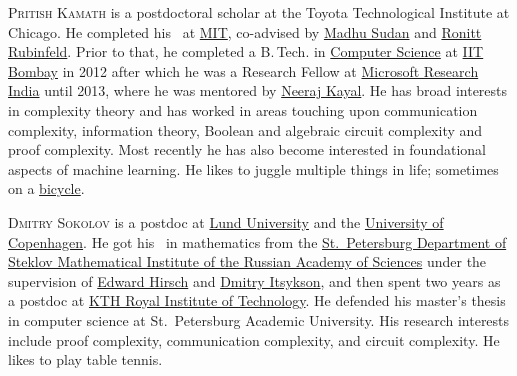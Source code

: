 \documentclass{toc}
\begin{document}
\begin{tocaboutauthors}
\begin{tocabout}[kamath]
 \textsc{Pritish Kamath} is a postdoctoral scholar at the Toyota Technological Institute at Chicago. He completed his \phd\ at \href{www.mit.edu}{MIT}, co-advised by
%
\href{http://madhu.seas.harvard.edu/}{Madhu Sudan} and \href{http://people.csail.mit.edu/ronitt/}{Ronitt Rubinfeld}. Prior to that, he completed a B.\,Tech. in \href{https://www.cse.iitb.ac.in/}{Computer Science} at \href{http://www.iitb.ac.in/}{IIT Bombay} in 2012 after which he was a Research Fellow at \href{https://www.microsoft.com/en-us/research/lab/microsoft-research-india/}{Microsoft Research India} until 2013, where he was mentored by \href{https://www.microsoft.com/en-us/research/people/neeraka/}{Neeraj Kayal}. He has broad interests in complexity theory and has worked in areas touching upon communication complexity, information theory, Boolean and algebraic circuit complexity and proof 
%
complexity.  Most recently he has also become  %
interested in foundational aspects of machine learning. 
He likes to juggle multiple things in life; sometimes on a 
\href{https://youtu.be/iXgAfveUTMk}{bicycle}.
\end{tocabout}

\begin{tocabout}[sokolov]
\textsc{Dmitry Sokolov} is a postdoc
%
%
at \href{https://www.lu.se/}{Lund University} and
the  %
\href{https://www.ku.dk/english/}{University of Copenhagen}. 
He got his \phd~in mathematics from
the  %
\href{http://www.pdmi.ras.ru/pdmi/en}{St.\ Petersburg Department of 
Steklov Mathematical Institute of
the  %
Russian Academy of Sciences} under the supervision of
\href{https://logic.pdmi.ras.ru/~hirsch/}{Edward Hirsch} and
\href{https://logic.pdmi.ras.ru/~dmitrits/}{Dmitry Itsykson}, 
and then spent two years as a postdoc at
\href{https://www.kth.se/}{KTH Royal Institute of Technology}. 
He defended his master's thesis in computer
science at St.\ Petersburg Academic University. His research interests 
%
include   %
proof complexity, communication complexity, and circuit complexity. 
He likes to play table tennis. 
\end{tocabout}
\end{tocaboutauthors}
\end{document}

